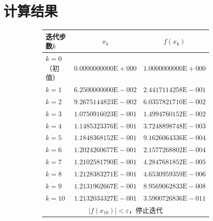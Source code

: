 \documentclass[11pt]{article}
\begin{document}
\section{计算结果}
\begin{figure}
    \centering
    \begin{subfigure}[t]{\textwidth}
        \centering
        \begin{tabular}{|l|c|c|}
            \hline
            迭代步数$k$            & $x_k$                        & $f(x_k)$                     \\
            \hline $k = 0$（初值） & $0.0000000000\text{E}{+}000$ & $1.0000000000\text{E}{+}000$ \\
            \hline $k = 1$         & $6.2500000000\text{E}{-}002$ & $2.4417114258\text{E}{-}001$ \\
            \hline $k = 2$         & $9.2675144823\text{E}{-}002$ & $6.0357821710\text{E}{-}002$ \\
            \hline $k = 3$         & $1.0750916023\text{E}{-}001$ & $1.4994760152\text{E}{-}002$ \\
            \hline $k = 4$         & $1.1485323376\text{E}{-}001$ & $3.7248898748\text{E}{-}003$ \\
            \hline $k = 5$         & $1.1848368152\text{E}{-}001$ & $9.1626064336\text{E}{-}004$ \\
            \hline $k = 6$         & $1.2024260677\text{E}{-}001$ & $2.1577268802\text{E}{-}004$ \\
            \hline $k = 7$         & $1.2102581790\text{E}{-}001$ & $4.2847681852\text{E}{-}005$ \\
            \hline $k = 8$         & $1.2128383271\text{E}{-}001$ & $4.6530959359\text{E}{-}006$ \\
            \hline $k = 9$         & $1.2131962667\text{E}{-}001$ & $8.9569062833\text{E}{-}008$ \\
            \hline $k = 10$        & $1.2132034327\text{E}{-}001$ & $3.5900726836\text{E}{-}011$ \\
            \hline \multicolumn{3}{|c|}{$|f(x_{10})| < \varepsilon$，停止迭代}                   \\
            \hline
        \end{tabular}
        \label{table:Newton1}
    \end{subfigure}
    \begin{subfigure}[t]{\textwidth}
        \centering

\end{subfigure}
\end{figure}
\end{document}
